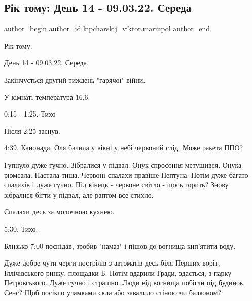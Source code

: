  
 
 
 
 

\subsection{Рік тому:  День 14 - 09.03.22. Середа}
\label{sec:09_03_2023.fb.kipcharskij_viktor.mariupol.1.r_k_tomu___den_14___}

\ifcmt
 author_begin
   author_id kipcharskij_viktor.mariupol
 author_end
\fi


Рік тому: 

День 14 - 09.03.22. Середа. 

Закінчується другий тиждень "гарячої" війни.

У кімнаті температура 16,6. 

0:15 - 1:25. Тихо

Після 2:25 заснув.

4:39. Канонада. Оля бачила у вікні у небі червоний слід. Може ракета ППО? 

Гупнуло дуже гучно. Зібралися у підвал. Онук спросоння метушився. Онука
рюмсала. Настала тиша. Червоні спалахи правіше Нептуна. Потім дуже багато
спалахів і дуже гучно. Під кінець - червоне світло - щось горить? Знову
зібралися бігти у підвал, але раптом все стихло.

Спалахи десь за молочною кухнею.

5:30. Тихо.

Близько 7:00 поснідав, зробив "намаз" і пішов до вогнища кип'ятити воду.

Дуже добре чути черги пострілів з автоматів десь біля Перших воріт,
Іллічівського ринку, площадки Б. Потім вдарили Гради, здається, з парку
Петровського. Дуже гучно і страшно. Люди від вогнища побігли під будинок. Сенс?
Щоб посікло уламками скла або завалило стіною чи балконом?

